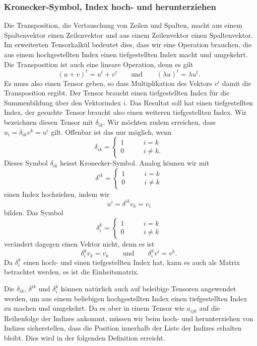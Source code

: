 \subsubsection{Kronecker-Symbol, Index hoch- und herunterziehen}
Die Transposition, die Vertauschung von Zeilen und Spalten,
macht aus einem Spaltenvektor einen Zeilenvektor und aus einem
Zeilenvektor einen Spaltenvektor.
Im erweiterten Tensorkalkül bedeutet dies, dass wir eine Operation
brauchen, die aus einem hochgestellten Index einen tiefgestellten
Index macht und umgekehrt.
Die Transposition ist auch eine lineare Operation, denn es gilt
\[
(u+v)^t = u^t + v^t
\qquad
\text{und}
\qquad
(\lambda u)^t = \lambda u^t.
\]
Es muss also einen Tensor geben, so dass Multiplikation des Vektors $v^i$
damit die Transposition ergibt.
Der Tensor braucht einen tiefgestellten Index für die Summenbildung
über den Vektorindex $i$.
Das Resultat soll hat einen tiefgestellten Index, der gesuchte Tensor
braucht also einen weiteren tiefgestellten Index.
Wir bezeichnen diesen Tensor mit $\delta_{ik}$.
Wir möchten zudem erreichen, dass $u_i=\delta_{ik}v^k=u^i$ gilt.
Offenbar ist das nur möglich, wenn
\[
\delta_{ik}
=
\begin{cases}
1&\qquad i=k   \\
0&\qquad i\ne k.
\end{cases}
\]
Dieses Symbol $\delta_{ik}$ heisst Kronecker-Symbol.
Analog können wir mit
\[
\delta^{ik}
=
\begin{cases}
1&\qquad i=k   \\
0&\qquad i\ne k
\end{cases}
\]
einen Index hochziehen, indem wir
\[
u^i=\delta^{ik}v_k = v_i
\]
bilden.
Das Symbol
\[
\delta_i^k
=
\begin{cases}
1&\qquad i=k   \\
0&\qquad i\ne k
\end{cases}
\]
verändert dagegen einen Vektor nicht, denn es ist
\[
\delta_i^k v_k = v_k
\qquad\text{und}\qquad
\delta_i^k v^i = v^k.
\]
Da $\delta_i^k$ einen hoch- und einen tiefgestellten Index hat,
kann es auch als Matrix betrachtet werden, es ist die Einheitsmatrix.

Die $\delta_{ik}$, $\delta^{ik}$ und $\delta_i^k$ können natürlich auch
auf beleibige Tensoren angewendet werden, um aus einem beliebigen
hochgestellten Index einen tiefgestellten Index zu machen und umgekehrt.
Da es aber in einem Tensor wie $a_{ijk}$ auf die Reihenfolge der Indizes
ankommt, müssen wir beim hoch- und herunterziehen von Indizes sicherstellen,
dass die Position innerhalb der Liste der Indizes erhalten bleibt.
Dies wird in der folgenden Definition erreicht.

